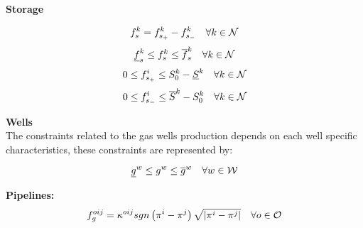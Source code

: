 \textbf{Storage}

\begin{equation}
f_{s}^{k} = f_{s_+}^{k}  - f_{s_-}^{k}\quad \forall k \in \cal{N}
\label{fs}
\end{equation}
\begin{equation}
\underline{f}^{k}_{s} \le f^{k}_{s} \le \overline{f}^{k}_{s} \quad \forall k \in \cal{N}
\label{fs_limits}
\end{equation}
\begin{equation}
0 \le f_{s_+}^{i} \le S^{k}_{0}  - \underline{S}^{k} \quad \forall k \in \cal{N}
\label{fs+}
\end{equation}
\begin{equation}
0 \le f_{s_-}^{i} \le \overline{S}^{k} - S^{k}_{0} \quad \forall k \in \cal{N}
\label{fs-}
\end{equation}

\textbf{Wells}\\

The constraints related to the gas wells production depends on each well specific characteristics, these constraints are represented by:

\begin{equation}
\underline{g}^{w} \le g^{w} \le \overline{g}^{w} \quad \forall w \in \cal{W}
\label{g_limits}
\end{equation}

\textbf{Pipelines:} \\

\begin{equation}
{f}^{oij}_{g} = {{\kappa}^{oij}} sgn \left(\pi^{i}-\pi^{j}\right) {\sqrt{\left|\pi^{i}-\pi^{j}\right|}} \quad \forall o \in {\cal{O}}
\label{wey_eq}
\end{equation}

